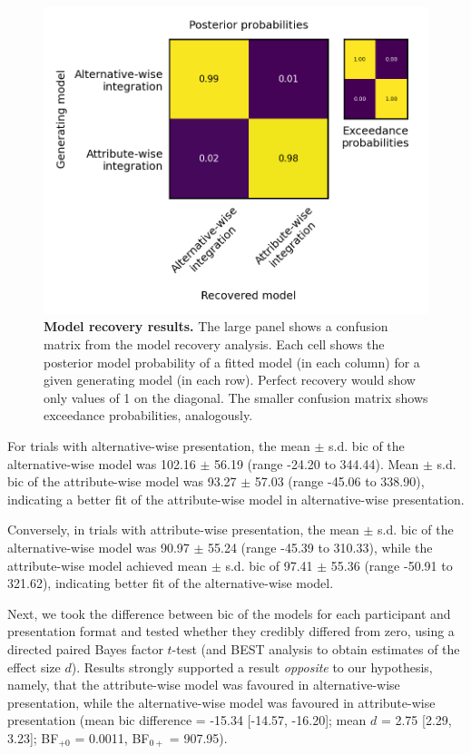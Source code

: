 \documentclass[11pt, a4paper, twocolumn, abstract]{scrartcl}
\begin{document}
\begin{figure}[htbp]
    \centering
    \includegraphics[width=\linewidth]{figures/ddm_recovery_models.png}
    \caption{\textbf{Model recovery results.} The large panel shows a confusion matrix from the model recovery analysis. Each cell shows the posterior model probability of a fitted model (in each column) for a given generating model (in each row). Perfect recovery would show only values of 1 on the diagonal. The smaller confusion matrix shows exceedance probabilities, analogously.}
    \label{fig:modelingmodelrecovery}
\end{figure}

For trials with alternative-wise presentation, the mean $\pm$ s.d. \gls{bic} of the alternative-wise model was 102.16 $\pm$ 56.19 (range -24.20 to 344.44). Mean $\pm$ s.d. \gls{bic} of the attribute-wise model was 93.27 $\pm$ 57.03 (range -45.06 to 338.90), indicating a better fit of the attribute-wise model in alternative-wise presentation.

Conversely, in trials with attribute-wise presentation, the mean $\pm$ s.d. \gls{bic} of the alternative-wise model was 90.97 $\pm$ 55.24 (range -45.39 to 310.33), while the attribute-wise model achieved mean $\pm$ s.d. \gls{bic} of 97.41 $\pm$ 55.36 (range -50.91 to 321.62), indicating better fit of the alternative-wise model.

Next, we took the difference between \gls{bic} of the models for each participant and presentation format and tested whether they credibly differed from zero, using a directed paired Bayes factor $t$-test (and BEST analysis to obtain estimates of the effect size $d$). 
Results strongly supported a result \emph{opposite} to our hypothesis, namely, that the attribute-wise model was favoured in alternative-wise presentation, while the alternative-wise model was favoured in attribute-wise presentation (mean \gls{bic} difference = -15.34 [-14.57, -16.20]; mean $d$ = 2.75 [2.29, 3.23]; BF$_{{+}0}$ = 0.0011, BF$_{0{+}}$ = 907.95).
\end{document}
